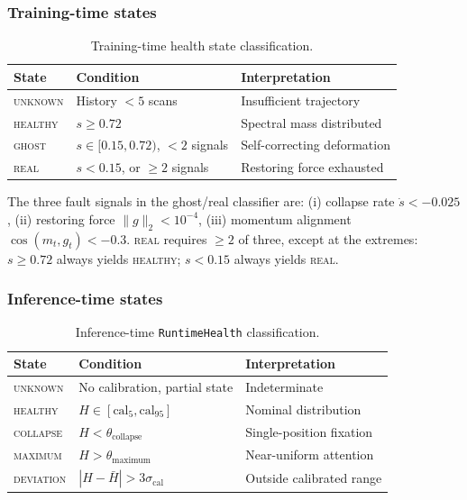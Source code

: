 \documentclass[11pt,a4paper]{article}
\theoremstyle{plain}
\begin{document}
\subsubsection{Training-time states}

\begin{table}[h]
\centering
\caption{Training-time health state classification.}
\label{tab:training_states}
\begin{tabular}{lll}
\toprule
State & Condition & Interpretation \\
\midrule
\textsc{unknown}  & History $< 5$ scans & Insufficient trajectory \\
\textsc{healthy}  & $s \geq 0.72$ & Spectral mass distributed \\
\textsc{ghost}    & $s \in [0.15, 0.72)$, $< 2$ signals & Self-correcting deformation \\
\textsc{real}     & $s < 0.15$, or $\geq 2$ signals & Restoring force exhausted \\
\bottomrule
\end{tabular}
\end{table}

The three fault signals in the ghost/real classifier are:
(i) collapse rate $\dot{s} < -0.025$,
(ii) restoring force $\|g\|_2 < 10^{-4}$,
(iii) momentum alignment $\cos(m_t, g_t) < -0.3$.
\textsc{real} requires $\geq 2$ of three, except at the extremes:
$s \geq 0.72$ always yields \textsc{healthy};
$s < 0.15$ always yields \textsc{real}.

\subsubsection{Inference-time states}

\begin{table}[h]
\centering
\caption{Inference-time \texttt{RuntimeHealth} classification.}
\label{tab:inference_states}
\begin{tabular}{lll}
\toprule
State & Condition & Interpretation \\
\midrule
\textsc{unknown}   & No calibration, partial state & Indeterminate \\
\textsc{healthy}   & $H \in [\text{cal}_5, \text{cal}_{95}]$ & Nominal distribution \\
\textsc{collapse}  & $H < \theta_{\text{collapse}}$ & Single-position fixation \\
\textsc{maximum}   & $H > \theta_{\text{maximum}}$ & Near-uniform attention \\
\textsc{deviation} & $|H - \bar{H}| > 3\sigma_{\text{cal}}$ & Outside calibrated range \\
\bottomrule
\end{tabular}
\end{table}
\end{document}
